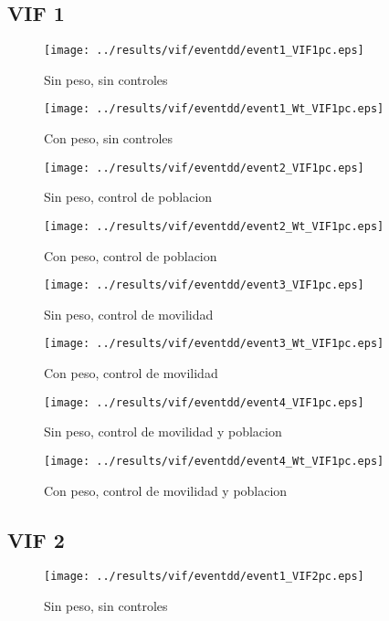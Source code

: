\documentclass[11pt,letterpaper]{article}
\begin{document}
		\subsection{VIF 1}
\begin{figure}[H]
\caption{Sin peso, sin controles}
\centering
\texttt{[image: ../results/vif/eventdd/event1\_VIF1pc.eps]}
\end{figure}

\begin{figure}[H]
\caption{Con peso, sin controles}
\centering
\texttt{[image: ../results/vif/eventdd/event1\_Wt\_VIF1pc.eps]}
\end{figure}
\begin{figure}[H]
\caption{Sin peso, control de poblacion}
\centering
\texttt{[image: ../results/vif/eventdd/event2\_VIF1pc.eps]}
\end{figure}

\begin{figure}[H]
\caption{Con peso, control de poblacion}
\centering
\texttt{[image: ../results/vif/eventdd/event2\_Wt\_VIF1pc.eps]}
\end{figure}
\begin{figure}[H]
\caption{Sin peso, control de movilidad}
\centering
\texttt{[image: ../results/vif/eventdd/event3\_VIF1pc.eps]}
\end{figure}

\begin{figure}[H]
\caption{Con peso, control de movilidad}
\centering
\texttt{[image: ../results/vif/eventdd/event3\_Wt\_VIF1pc.eps]}
\end{figure}
\begin{figure}[H]
\caption{Sin peso, control de movilidad y poblacion}
\centering
\texttt{[image: ../results/vif/eventdd/event4\_VIF1pc.eps]}
\end{figure}

\begin{figure}[H]
\caption{Con peso, control de movilidad y poblacion}
\centering
\texttt{[image: ../results/vif/eventdd/event4\_Wt\_VIF1pc.eps]}
\end{figure}
	
		\subsection{VIF 2}
\begin{figure}[H]
\caption{Sin peso, sin controles}
\centering
\texttt{[image: ../results/vif/eventdd/event1\_VIF2pc.eps]}
\end{figure}
\end{document}
